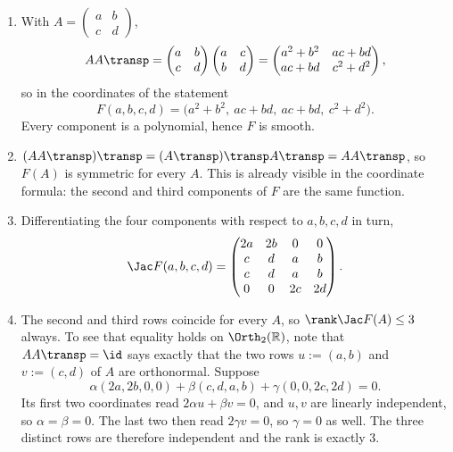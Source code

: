\begin{exercisesolution}
\label{sol:orthogonal_group_submanifold}
\begin{enumerate}[label=\textbf{(\alph*)}]
  \item With $A = \left(\begin{smallmatrix} a & b \\ c & d\end{smallmatrix}\right)$,
\[AA\transp = \begin{pmatrix} a & b \\ c & d \end{pmatrix}
              \begin{pmatrix} a & c \\ b & d \end{pmatrix}
            = \begin{pmatrix} a^2+b^2 & ac+bd \\ ac+bd & c^2+d^2 \end{pmatrix},\]
    so in the coordinates of the statement
\[F(a,b,c,d) = \big(a^2+b^2,\ ac+bd,\ ac+bd,\ c^2+d^2\big).\]
    Every component is a polynomial, hence $F$ is smooth.

  \item $(AA\transp)\transp = (A\transp)\transp A\transp = AA\transp$, so $F(A)$ is symmetric for
    every $A$. This is already visible in the coordinate formula: the second and third components
    of $F$ are the same function.

  \item Differentiating the four components with respect to $a,b,c,d$ in turn,
\[\Jac F(a,b,c,d) = \begin{pmatrix}
  2a & 2b & 0 & 0 \\
  c & d & a & b \\
  c & d & a & b \\
  0 & 0 & 2c & 2d
\end{pmatrix}.\]

  \item The second and third rows coincide for every $A$, so $\rank \Jac F(A) \le 3$ always. To see
    that equality holds on $\Orth_2(\mathbb{R})$, note that $AA\transp = \id$ says exactly that the
    two rows $u := (a,b)$ and $v := (c,d)$ of $A$ are orthonormal. Suppose
\[\alpha(2a,2b,0,0) + \beta(c,d,a,b) + \gamma(0,0,2c,2d) = 0.\]
    Its first two coordinates read $2\alpha u + \beta v = 0$, and $u,v$ are linearly independent,
    so $\alpha = \beta = 0$. The last two then read $2\gamma v = 0$, so $\gamma = 0$ as well. The
    three distinct rows are therefore independent and the rank is exactly $3$.


\end{enumerate}
\end{exercisesolution}
